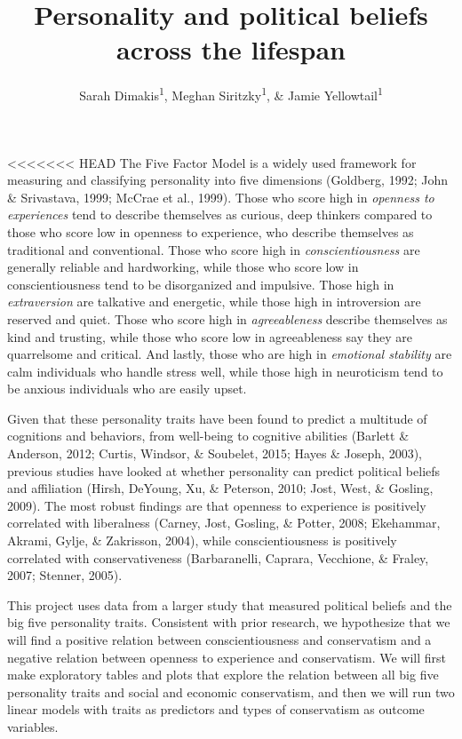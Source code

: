 \documentclass[man]{apa6}
\title{Personality and political beliefs across the lifespan}
\author{Sarah Dimakis\textsuperscript{1}, Meghan Siritzky\textsuperscript{1}, \& Jamie Yellowtail\textsuperscript{1}}
\date{}
\affiliation{
\vspace{0.5cm}
\textsuperscript{1} University of Oregon}
\begin{document}
\maketitle

<<<<<<< HEAD
The Five Factor Model is a widely used framework for measuring and
classifying personality into five dimensions (Goldberg, 1992; John \&
Srivastava, 1999; McCrae et al., 1999). Those who score high in
\emph{openness to experiences} tend to describe themselves as curious,
deep thinkers compared to those who score low in openness to experience,
who describe themselves as traditional and conventional. Those who score
high in \emph{conscientiousness} are generally reliable and hardworking,
while those who score low in conscientiousness tend to be disorganized
and impulsive. Those high in \emph{extraversion} are talkative and
energetic, while those high in introversion are reserved and quiet.
Those who score high in \emph{agreeableness} describe themselves as kind
and trusting, while those who score low in agreeableness say they are
quarrelsome and critical. And lastly, those who are high in
\emph{emotional stability} are calm individuals who handle stress well,
while those high in neuroticism tend to be anxious individuals who are
easily upset.

Given that these personality traits have been found to predict a
multitude of cognitions and behaviors, from well-being to cognitive
abilities (Barlett \& Anderson, 2012; Curtis, Windsor, \& Soubelet,
2015; Hayes \& Joseph, 2003), previous studies have looked at whether
personality can predict political beliefs and affiliation (Hirsh,
DeYoung, Xu, \& Peterson, 2010; Jost, West, \& Gosling, 2009). The most
robust findings are that openness to experience is positively correlated
with liberalness (Carney, Jost, Gosling, \& Potter, 2008; Ekehammar,
Akrami, Gylje, \& Zakrisson, 2004), while conscientiousness is
positively correlated with conservativeness (Barbaranelli, Caprara,
Vecchione, \& Fraley, 2007; Stenner, 2005).

This project uses data from a larger study that measured political
beliefs and the big five personality traits. Consistent with prior
research, we hypothesize that we will find a positive relation between
conscientiousness and conservatism and a negative relation between
openness to experience and conservatism. We will first make exploratory
tables and plots that explore the relation between all big five
personality traits and social and economic conservatism, and then we
will run two linear models with traits as predictors and types of
conservatism as outcome variables.
\end{document}
